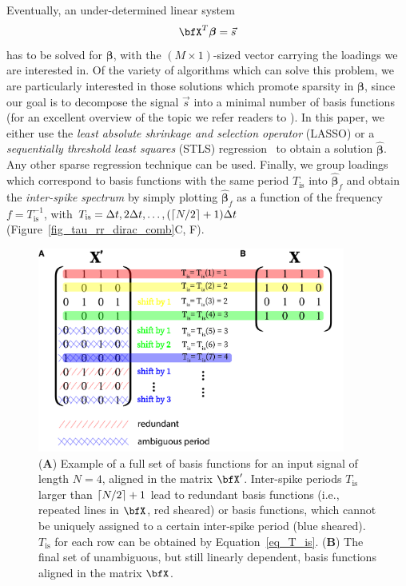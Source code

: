 \documentclass[entropy,article,accept,pdftex,moreauthors]{Definitions/mdpi}
\DeclarePairedDelimiter\ceil{\lceil}{\rceil}
\begin{document}
Eventually, an under-determined linear system
\begin{equation}
\bfX^T \boldsymbol{\beta}=\vec{s}
\label{eq_linear_system}
\end{equation}  
has to be solved for $\boldsymbol\beta$, with the $(M\times 1)$-sized vector carrying the loadings we are interested in. Of the variety of algorithms which can solve this problem, we are 
particularly interested in those solutions which promote sparsity in $\boldsymbol\beta$, since our goal is to decompose the signal $\vec{s}$ into a minimal number of basis 
functions (for an excellent overview of the topic we refer readers to \citet{Brunton2019}). In this paper, we either use the \textit{least absolute shrinkage and selection operator} 
(LASSO) \cite{Tibshirani1996} or a \textit{sequentially threshold least squares} (STLS) regression~\cite{Brunton2016,Brunton2019} to obtain a solution $\hat{\boldsymbol\beta}$. Any other 
sparse regression technique can be used. Finally, we group loadings 
which correspond to basis functions with the same period 
$T_\text{is}$ into $\hat{\boldsymbol\beta}_f$ and obtain the 
\textit{inter-spike spectrum} by simply plotting $\hat{\boldsymbol\beta}_f$ as a function of the frequency $f=T_\text{is}^{-1}$, with $T_\text{is}=\Delta t, 2\Delta t, \dots, (\ceil*{N/2}+1) \Delta t$ 
(Figure~\ref{fig_tau_rr_dirac_comb}C, F).

\begin{figure}[H]
\includegraphics[width=0.9\textwidth]{./figures/fig_tau_rr_basis_functions}
\caption{(\textbf{A}) Example of a full set of basis functions for an input signal of length $N=4$, aligned in the matrix $\bfX'$. Inter-spike periods $T_{\text{is}}$ larger 
than $\ceil*{N/2}+1$ lead to redundant basis functions (i.e., repeated lines in $\bfX$, red sheared) or basis functions, which cannot be uniquely assigned to a certain inter-spike period 
(blue sheared). $T_{\text{is}}$ for each row can be obtained by Equation~\eqref{eq_T_is}. (\textbf{B}) The final set of unambiguous, but still linearly dependent, basis functions aligned in the matrix $\bfX$.} \label{fig_tau_rr_basis_functions}
\end{figure}
\end{document}
